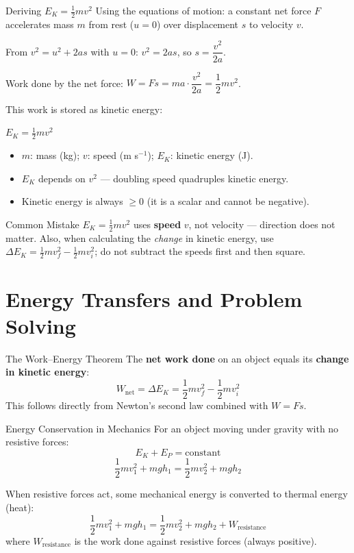 \begin{formulabox}{Deriving \texorpdfstring{$E_K = \frac{1}{2}mv^2$}{Ek = ½mv²}}
Using the equations of motion: a constant net force $F$ accelerates mass $m$ from rest ($u = 0$) over displacement $s$ to velocity $v$.

From $v^2 = u^2 + 2as$ with $u = 0$: \quad $v^2 = 2as$, so $s = \dfrac{v^2}{2a}$.

Work done by the net force: $W = Fs = ma \cdot \dfrac{v^2}{2a} = \dfrac{1}{2}mv^2$.

This work is stored as kinetic energy:
\begin{center}
\Large $E_K = \frac{1}{2}mv^2$
\end{center}
\begin{itemize}[itemsep=2pt]
  \item $m$: mass (kg); \quad $v$: speed (m s$^{-1}$); \quad $E_K$: kinetic energy (J).
  \item $E_K$ depends on $v^2$ — doubling speed quadruples kinetic energy.
  \item Kinetic energy is always $\geq 0$ (it is a scalar and cannot be negative).
\end{itemize}
\end{formulabox}

\begin{warningbox}{Common Mistake}
$E_K = \frac{1}{2}mv^2$ uses \textbf{speed} $v$, not velocity — direction does not matter. Also, when calculating the \emph{change} in kinetic energy, use $\Delta E_K = \frac{1}{2}mv_f^2 - \frac{1}{2}mv_i^2$; do not subtract the speeds first and then square.
\end{warningbox}

\section{Energy Transfers and Problem Solving}

\begin{keybox}{The Work--Energy Theorem}
The \textbf{net work done} on an object equals its \textbf{change in kinetic energy}:
$$W_{\text{net}} = \Delta E_K = \frac{1}{2}mv_f^2 - \frac{1}{2}mv_i^2$$
This follows directly from Newton's second law combined with $W = Fs$.
\end{keybox}

\begin{keybox}{Energy Conservation in Mechanics}
For an object moving under gravity with no resistive forces:
$$E_K + E_P = \text{constant}$$
$$\frac{1}{2}mv_1^2 + mgh_1 = \frac{1}{2}mv_2^2 + mgh_2$$

When resistive forces act, some mechanical energy is converted to thermal energy (heat):
$$\frac{1}{2}mv_1^2 + mgh_1 = \frac{1}{2}mv_2^2 + mgh_2 + W_{\text{resistance}}$$
where $W_{\text{resistance}}$ is the work done against resistive forces (always positive).
\end{keybox}



